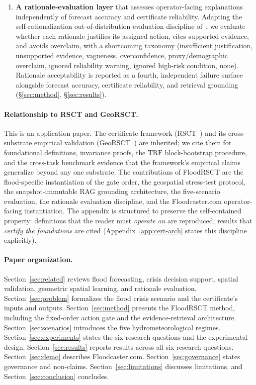 \documentclass[sigconf,nonacm=true,review,authoryear]{acmart}
\begin{document}
\begin{enumerate}
\item \textbf{A rationale-evaluation layer} that assesses operator-facing explanations independently of forecast accuracy and certificate reliability. Adapting the self-rationalization out-of-distribution evaluation discipline of~\citet{rocha2024selfrat}, we evaluate whether each rationale justifies its assigned action, cites supported evidence, and avoids overclaim, with a shortcoming taxonomy (insufficient justification, unsupported evidence, vagueness, overconfidence, proxy/demographic overclaim, ignored reliability warning, ignored high-risk condition, none). Rationale acceptability is reported as a fourth, independent failure surface alongside forecast accuracy, certificate reliability, and retrieval grounding (\S\ref{sec:method}, \S\ref{sec:results}).
\end{enumerate}

\paragraph{Relationship to RSCT and GeoRSCT.}
This is an application paper. The certificate framework (RSCT~\citep{martin2026rsct}) and its cross-substrate empirical validation (GeoRSCT~\citep{martin2026georsct}) are inherited; we cite them for foundational definitions, invariance proofs, the $\mathrm{TRF}$ block-bootstrap procedure, and the cross-task benchmark evidence that the framework's empirical claims generalize beyond any one substrate. The contributions of FloodRSCT are the flood-specific instantiation of the gate order, the geospatial stress-test protocol, the snapshot-immutable RAG grounding architecture, the five-scenario evaluation, the rationale evaluation discipline, and the Floodcaster.com operator-facing instantiation. The appendix is structured to preserve the self-contained property: definitions that the reader must \emph{operate on} are reproduced; results that \emph{certify the foundations} are cited (Appendix~\ref{app:cert-arch} states this discipline explicitly).

\paragraph{Paper organization.}
Section~\ref{sec:related} reviews flood forecasting, crisis decision support, spatial validation, geometric spatial learning, and rationale evaluation. Section~\ref{sec:problem} formalizes the flood crisis scenario and the certificate's inputs and outputs. Section~\ref{sec:method} presents the FloodRSCT method, including the fixed-order action gate and the evidence-retrieval architecture. Section~\ref{sec:scenarios} introduces the five hydrometeorological regimes. Section~\ref{sec:experiments} states the six research questions and the experimental design. Section~\ref{sec:results} reports results across all six research questions. Section~\ref{sec:demo} describes Floodcaster.com. Section~\ref{sec:governance} states governance and non-claims. Section~\ref{sec:limitations} discusses limitations, and Section~\ref{sec:conclusion} concludes.
\end{document}
